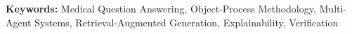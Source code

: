 
\vspace{1em}
{\raggedright\noindent\textbf{Keywords:} Medical Question Answering, Object-Process Methodology, Multi-Agent Systems, Retrieval-Augmented Generation, Explainability, Verification\par}
